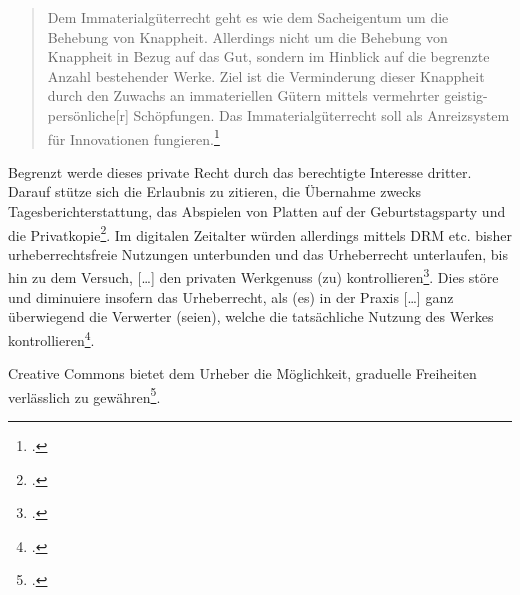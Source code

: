 \documentclass[DIV=calc,BCOR=5mm,11pt,headings=small,oneside,abstract=true, toc=bib]{scrartcl}
\begin{document}
\begin{quote}
\glqq{}Dem Immaterialgüterrecht geht es wie dem Sacheigentum um die
Behebung von Knappheit. Allerdings nicht um die Behebung von Knappheit in
Bezug auf das Gut, sondern im Hinblick auf die begrenzte Anzahl
bestehender Werke. Ziel ist die Verminderung dieser Knappheit durch den
Zuwachs an immateriellen Gütern mittels vermehrter geistig-persönliche[r]
Schöpfungen. Das Immaterialgüterrecht soll als Anreizsystem für
Innovationen fungieren.\grqq{}\footcite[][149 Fehler im Original]{Euler2006a}
\end{quote}

Begrenzt werde dieses private Recht durch das berechtigte Interesse dritter.
Darauf stütze sich die Erlaubnis zu zitieren, die \glqq{}Übernahme zwecks
Tagesberichterstattung\grqq{}, das \glqq{}Abspielen von Platten auf der
Geburtstagsparty\grqq{} und die Privatkopie\footcite[vgl.][149]{Euler2006a}. Im
digitalen Zeitalter würden allerdings mittels DRM etc. \glqq{}bisher
urheberrechtsfreie Nutzungen\grqq{} unterbunden und das Urheberrecht unterlaufen,
bis hin zu dem Versuch, \glqq{}[\ldots] den privaten Werkgenuss (zu)
kontrollieren\grqq{}\footcite[vgl.][151]{Euler2006a}. Dies störe und diminuiere
insofern das Urheberrecht, als \glqq{}(es) in der Praxis [\ldots] ganz
überwiegend die Verwerter (seien), welche die tatsächliche Nutzung des
Werkes kontrollieren\grqq{}\footcite[vgl.][152]{Euler2006a}.

Creative Commons bietet dem Urheber die Möglichkeit, graduelle Freiheiten
verlässlich zu gewähren\footcite[vgl. dazu][154f]{Euler2006a}.



\end{document}
